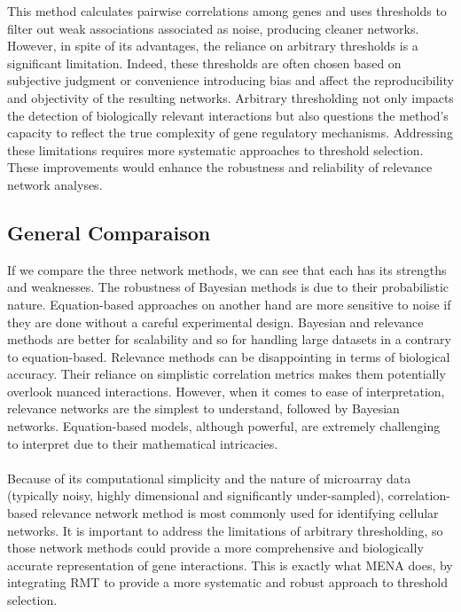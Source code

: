 This method calculates pairwise correlations among genes and uses thresholds to filter out weak associations associated as noise, producing cleaner networks\cite{schmitt_elucidation_2004}.
However, in spite of its advantages, the reliance on arbitrary thresholds is a significant limitation.
Indeed, these thresholds are often chosen based on subjective judgment or convenience introducing bias and affect the reproducibility and objectivity of the resulting networks\cite{oldham_conservation_2006}.
Arbitrary thresholding not only impacts the detection of biologically relevant interactions but also questions the method’s capacity to reflect the true complexity of gene regulatory mechanisms\cite{gardner_reverse-engineering_2005}.
Addressing these limitations requires more systematic approaches to threshold selection.
These improvements would enhance the robustness and reliability of relevance network analyses.

\subsection{General Comparaison}\label{subsec:general-comparaison}

If we compare the three network methods, we can see that each has its strengths and weaknesses.
The robustness of Bayesian methods is due to their probabilistic nature.
Equation-based approaches on another hand are more sensitive to noise if they are done without a careful experimental design.
Bayesian and relevance methods are better for scalability and so for handling large datasets in a contrary to equation-based.
Relevance methods can be disappointing in terms of biological accuracy.
Their reliance on simplistic correlation metrics makes them potentially overlook nuanced interactions.
However, when it comes to ease of interpretation, relevance networks are the simplest to understand, followed by Bayesian networks.
Equation-based models, although powerful, are extremely challenging to interpret due to their mathematical intricacies.
\\\\
Because of its computational simplicity and the nature of microarray data (typically noisy, highly dimensional and significantly under-sampled)\cite{gardner_reverse-engineering_2005}, correlation-based relevance network method is most commonly used for identifying cellular networks.
It is important to address the limitations of arbitrary thresholding, so those network methods could provide a more comprehensive and biologically accurate representation of gene interactions.
This is exactly what MENA does, by integrating RMT to provide a more systematic and robust approach to threshold selection.